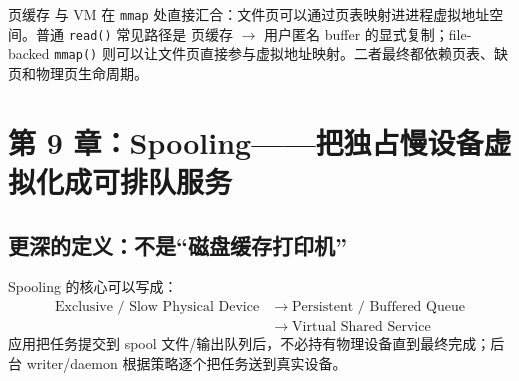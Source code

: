 \documentclass[UTF8,fontset=fandol,11pt,a4paper]{ctexart}
\newcommand{\code}[1]{\texttt{#1}}
\newcommand{\arr}{\;\longrightarrow\;}
\begin{document}
\begin{bridge}[与虚拟内存专题的接口]
页缓存 与 VM 在 \code{mmap} 处直接汇合：文件页可以通过页表映射进进程虚拟地址空间。普通 \code{read()} 常见路径是 页缓存 $\to$ 用户匿名 buffer 的显式复制；file-backed \code{mmap()} 则可以让文件页直接参与虚拟地址映射。二者最终都依赖页表、缺页和物理页生命周期。
\end{bridge}

\section{第 9 章：Spooling——把独占慢设备虚拟化成可排队服务}

\subsection{更深的定义：不是“磁盘缓存打印机”}
Spooling 的核心可以写成：
\[
\boxed{
\begin{aligned}
\text{Exclusive / Slow Physical Device}
&\arr
\text{Persistent / Buffered Queue}\\
&\arr
\text{Virtual Shared Service}
\end{aligned}
}
\]
应用把任务提交到 spool 文件/输出队列后，不必持有物理设备直到最终完成；后台 writer/daemon 根据策略逐个把任务送到真实设备。
\end{document}
